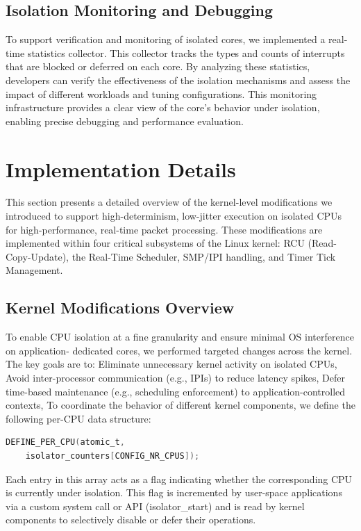 \documentclass[letterpaper]{article}
\begin{document}
\subsection{Isolation Monitoring and Debugging}
\label{subsec:isolation-monitoring}

To support verification and monitoring of isolated cores, we implemented a real-time statistics collector. This collector tracks the types and counts of interrupts that are blocked or deferred on each core. By analyzing these statistics, developers can verify the effectiveness of the isolation mechanisms and assess the impact of different workloads and tuning configurations. This monitoring infrastructure provides a clear view of the core’s behavior under isolation, enabling precise debugging and performance evaluation.

\section{Implementation Details}
This section presents a detailed overview of the kernel-level modifications we introduced to
support high-determinism, low-jitter execution on isolated CPUs for high-performance, real-time
packet processing. These modifications are implemented within four critical subsystems of the
Linux kernel: RCU (Read-Copy-Update), the Real-Time Scheduler, SMP/IPI handling, and Timer Tick
Management. 

\subsection{Kernel Modifications Overview}
To enable CPU isolation at a fine granularity and ensure minimal OS interference on application-
dedicated cores, we performed targeted changes across the kernel. The key goals are to:
Eliminate unnecessary kernel activity on isolated CPUs,
Avoid inter-processor communication (e.g., IPIs) to reduce latency spikes,
Defer time-based maintenance (e.g., scheduling enforcement) to application-controlled contexts,
To coordinate the behavior of different kernel components, we define the following per-CPU data
structure:

\begin{lstlisting}[language=C, caption={Per-CPU isolator counter definition}]
DEFINE_PER_CPU(atomic_t,
    isolator_counters[CONFIG_NR_CPUS]);
\end{lstlisting}
Each entry in this array acts as a flag indicating whether the corresponding CPU is currently under
isolation. This flag is incremented by user-space applications via a custom system call or API
(isolator\_start) and is read by kernel components to selectively disable or defer their operations.
\end{document}
